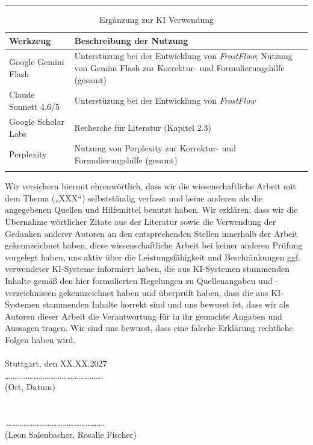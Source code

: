 \documentclass[../../main.tex]{subfiles}
\begin{document}
\begin{onehalfspacing}
\rule{\linewidth}{0.5mm}
\begin{longtable}{|>{\raggedright\arraybackslash}p{4cm}|
  >{\raggedright\arraybackslash}p{10cm}|}
\hline
\textbf{Werkzeug} & \textbf{Beschreibung der Nutzung} \\ \hline
\endhead
Google Gemini Flash &
Unterstüzung bei der Entwicklung von \textit{FrostFlow}; Nutzung von Gemini Flash zur Korrektur- und Formulierungshilfe (gesamt) \\ \hline

Claude Sonnett 4.6/5 &
Unterstüzung bei der Entwicklung von \textit{FrostFlow} \\ \hline

Google Scholar Labs &
Recherche für Literatur (Kapitel 2.3) \\ \hline

Perplexity &
Nutzung von Perplexity zur Korrektur- und Formulierungshilfe (gesamt) \\ \hline
\caption{Ergänzung zur KI Verwendung}
\end{longtable}
Wir versichern hiermit ehrenwörtlich, dass wir die wissenschaftliche Arbeit mit dem Thema 
(„XXX“) 
selbstständig verfasst und keine anderen als die angegebenen Quellen und Hilfsmittel benutzt haben. 
Wir erklären, dass wir die Übernahme wörtlicher Zitate aus der Literatur sowie die Verwendung der 
Gedanken anderer Autoren an den entsprechenden Stellen innerhalb der Arbeit gekennzeichnet haben,
diese wissenschaftliche Arbeit bei keiner anderen Prüfung vorgelegt haben,
uns aktiv über die Leistungsfähigkeit und Beschränkungen ggf. verwendeter KI-Systeme informiert haben, 
die aus KI-Systemen stammenden Inhalte gemäß den hier formulierten Regelungen zu Quellenangaben und -verzeichnissen gekennzeichnet haben
und überprüft haben, dass die aus KI-Systemen stammenden Inhalte korrekt sind und
uns bewusst ist, dass wir als Autoren dieser Arbeit die Verantwortung für in 
ihr gemachte Angaben und Aussagen tragen.
Wir sind uns bewusst, dass eine falsche Erklärung rechtliche Folgen haben wird.\\\\
Stuttgart, den XX.XX.2027 \\ …………………………………………….     \\ 
(Ort, Datum)	   \\   \\   \\  
 \,…………………………………………….		\\								
(Leon Salenbacher, Rosalie Fischer)
\end{onehalfspacing}
\end{document}
